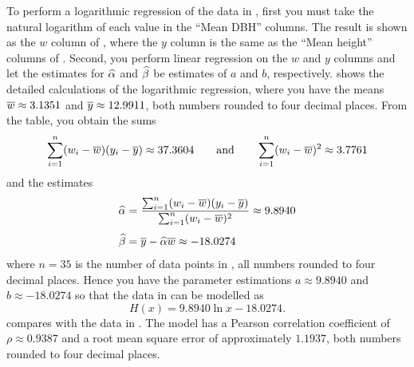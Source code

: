 \documentclass[a4paper,oneside,12pt]{article}
\begin{document}
{\begin{solution}
\begin{table}[!htbp]
\centering

\caption{%
  Detailed calculations of the logarithmic regression of the data in
  .  The $x$ and $y$ columns are the same
  as the ``Mean DBH'' and ``Mean height'' columns of
  .  Each value in the $w$ column is the
  natural logarithmic transformation of the corresponding value in the
  $x$ column, i.e.~$w_i = \ln x_i$.  If $\wbar$ and $\ybar$ are the
  means of the $w$ and $y$ columns, respectively, then
  $d(w_i) = w_i - \wbar$ and $d(y_i) = y_i - \ybar$.  Most values in
  the table have been rounded to four decimal places so as to fit the
  table.  However, you should not round these intermediate results
  when you do your own calculations.
}
\label{tab:logarithm:Sombo_log_regression}
\end{table}

To perform a logarithmic regression of the data in
, first you must take the natural logarithm
of each value in the ``Mean DBH'' columns.  The result is shown as the
$w$ column of , where the
$y$ column is the same as the ``Mean height'' columns of
.  Second, you perform linear regression on
the $w$ and $y$ columns and let the estimates for $\widehat{\alpha}$ and
$\widehat{\beta}$ be estimates of $a$ and $b$, respectively.
 shows the detailed
calculations of the logarithmic regression, where you have the means
$\overline{w} \approx 3.1351$ and $\overline{y} \approx 12.9911$, both numbers
rounded to four decimal places.  From the table, you obtain the sums
\[
\sum_{i=1}^n (w_i - \overline{w}) (y_i - \overline{y})
\approx
37.3604
\qquad
\text{and}
\qquad
\sum_{i=1}^n (w_i - \overline{w})^2
\approx
3.7761
\]
and the estimates
\begin{align*}
\widehat{\alpha}
&=
\frac{
  \sum_{i=1}^n (w_i - \overline{w}) (y_i - \overline{y})
}{
  \sum_{i=1}^n (w_i - \overline{w})^2
}
\approx
9.8940 \\[4pt]
\widehat{\beta}
&=
\overline{y} - \widehat{\alpha} \overline{w}
\approx
-18.0274
\end{align*}
where $n = 35$ is the number of data points in
, all numbers rounded to four decimal
places.  Hence you have the parameter estimations
$a \approx 9.8940$ and $b \approx -18.0274$ so that the data in
 can be modelled as
\begin{equation}
\label{eqn:logarithm:Sombo_log_regression}
H(x)
=
9.8940 \ln x - 18.0274.
\end{equation}
 compares
 with the data in
.  The model has a Pearson correlation
coefficient of $\rho \approx 0.9387$ and a root mean square error of
approximately $1.1937$, both numbers rounded to four decimal places.


\end{solution}}
\end{document}
